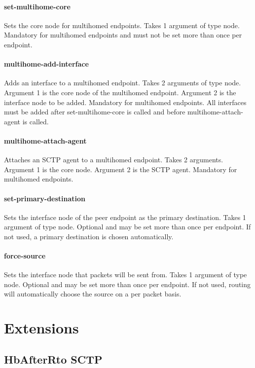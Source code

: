 	 \paragraph{set-multihome-core} Sets the core node for multihomed
	 endpoints. Takes 1 argument of type node. Mandatory for
	 multihomed endpoints and must not be set more than once per
	 endpoint.

	 \paragraph{multihome-add-interface} Adds an interface to a multihomed
	 endpoint. Takes 2 arguments of type node. Argument 1 is the core
	 node of the multihomed endpoint. Argument 2 is the interface node
	 to be added. Mandatory for multihomed endpoints. All interfaces
	 must be added after set-multihome-core is called and before
	 multihome-attach-agent is called.

	 \paragraph{multihome-attach-agent} Attaches an SCTP agent to a
	 multihomed endpoint. Takes 2 arguments. Argument 1 is the core
	 node. Argument 2 is the SCTP agent. Mandatory for multihomed
	 endpoints.

	 \paragraph{set-primary-destination} Sets the interface node of the peer
	 endpoint as the primary destination. Takes 1 argument of type
	 node. Optional and may be set more than once per endpoint. If not
	 used, a primary destination is chosen automatically.

	 \paragraph{force-source} Sets the interface node that packets will be
	 sent from. Takes 1 argument of type node. Optional and may be set
	 more than once per endpoint. If not used, routing will
	 automatically choose the source on a per packet basis.


   \section{Extensions}
   \label{sec:sctpExtensions}

      \subsection{HbAfterRto SCTP}

